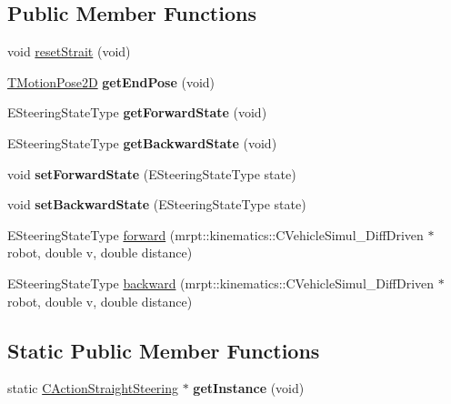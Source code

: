 \subsection*{Public Member Functions}
\begin{DoxyCompactItemize}
\item 
void \mbox{\hyperlink{classmotion_1_1CActionStraightSteering_aab377d9509a1cbd765ccbace788000a8}{reset\+Strait}} (void)
\item 
\mbox{\label{classmotion_1_1CActionStraightSteering_a9d4bdfc1c1d97ef7a90fd51e5fdd937f}} 
\mbox{\hyperlink{structmotion_1_1TMotionPose2D}{T\+Motion\+Pose2D}} {\bfseries get\+End\+Pose} (void)
\item 
\mbox{\label{classmotion_1_1CActionStraightSteering_a427dae612a3c046a8337ae3f482cd054}} 
E\+Steering\+State\+Type {\bfseries get\+Forward\+State} (void)
\item 
\mbox{\label{classmotion_1_1CActionStraightSteering_a5cec421cb431d80bcbe85722cddc5948}} 
E\+Steering\+State\+Type {\bfseries get\+Backward\+State} (void)
\item 
\mbox{\label{classmotion_1_1CActionStraightSteering_add14ef75be6057382e18a05b568ada64}} 
void {\bfseries set\+Forward\+State} (E\+Steering\+State\+Type state)
\item 
\mbox{\label{classmotion_1_1CActionStraightSteering_a24ebd656b7602ef89c8bd2ccd7bfb4c3}} 
void {\bfseries set\+Backward\+State} (E\+Steering\+State\+Type state)
\item 
E\+Steering\+State\+Type \mbox{\hyperlink{classmotion_1_1CActionStraightSteering_a65795e3e81ed82aa62d8f88ee2ac47ba}{forward}} (mrpt\+::kinematics\+::\+C\+Vehicle\+Simul\+\_\+\+Diff\+Driven $\ast$robot, double v, double distance)
\item 
E\+Steering\+State\+Type \mbox{\hyperlink{classmotion_1_1CActionStraightSteering_acece1a757ecdcfdff28d42d0c429bb38}{backward}} (mrpt\+::kinematics\+::\+C\+Vehicle\+Simul\+\_\+\+Diff\+Driven $\ast$robot, double v, double distance)
\end{DoxyCompactItemize}
\subsection*{Static Public Member Functions}
\begin{DoxyCompactItemize}
\item 
\mbox{\label{classmotion_1_1CActionStraightSteering_aba6b74c5722514d61e542aeb8d1786d2}} 
static \mbox{\hyperlink{classmotion_1_1CActionStraightSteering}{C\+Action\+Straight\+Steering}} $\ast$ {\bfseries get\+Instance} (void)
\end{DoxyCompactItemize}


